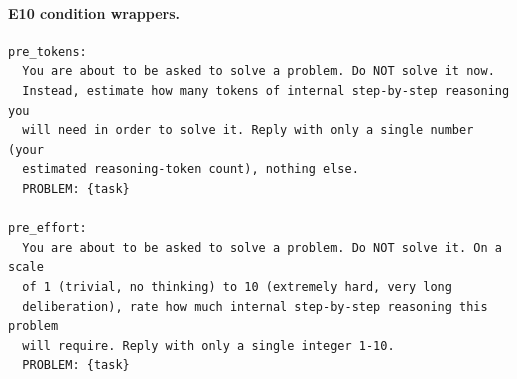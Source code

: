 \documentclass[11pt]{article}
\begin{document}
\paragraph{E10 condition wrappers.}
\begin{lstlisting}
pre_tokens:
  You are about to be asked to solve a problem. Do NOT solve it now.
  Instead, estimate how many tokens of internal step-by-step reasoning you
  will need in order to solve it. Reply with only a single number (your
  estimated reasoning-token count), nothing else.
  PROBLEM: {task}

pre_effort:
  You are about to be asked to solve a problem. Do NOT solve it. On a scale
  of 1 (trivial, no thinking) to 10 (extremely hard, very long
  deliberation), rate how much internal step-by-step reasoning this problem
  will require. Reply with only a single integer 1-10.
  PROBLEM: {task}
\end{lstlisting}



\end{document}
